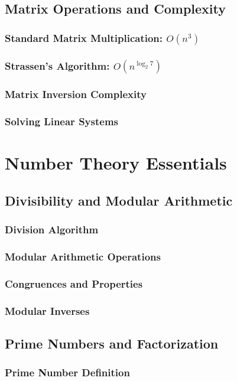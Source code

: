 \subsection{Matrix Operations and Complexity}
\subsubsection{Standard Matrix Multiplication: $O(n^3)$}
\subsubsection{Strassen's Algorithm: $O(n^{\log_2 7})$}
\subsubsection{Matrix Inversion Complexity}
\subsubsection{Solving Linear Systems}

\section{Number Theory Essentials}
\subsection{Divisibility and Modular Arithmetic}
\subsubsection{Division Algorithm}
\subsubsection{Modular Arithmetic Operations}
\subsubsection{Congruences and Properties}
\subsubsection{Modular Inverses}

\subsection{Prime Numbers and Factorization}
\subsubsection{Prime Number Definition}
